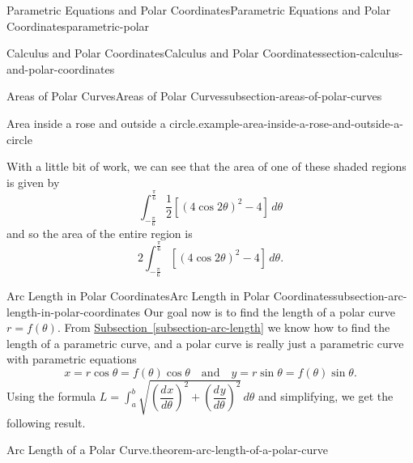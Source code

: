 \documentclass[oneside,10pt,]{book}
\numberwithin{equation}{section}
\newcommand{\dv}[3][]{\dfrac{d^{#1} #2}{d #3^{#1}}}
\begin{document}
\begin{chapterptx}{Parametric Equations and Polar Coordinates}{}{Parametric Equations and Polar Coordinates}{}{}{parametric-polar}
\begin{sectionptx}{Calculus and Polar Coordinates}{}{Calculus and Polar Coordinates}{}{}{section-calculus-and-polar-coordinates}
\begin{subsectionptx}{Areas of Polar Curves}{}{Areas of Polar Curves}{}{}{subsection-areas-of-polar-curves}
\begin{example}{Area inside a rose and outside a circle.}{example-area-inside-a-rose-and-outside-a-circle}
\begin{figure}
{
}
\end{figure}
\hypertarget{p-1053}{}%
With a little bit of work, we can see that the area of one of these shaded regions is given by%
%
\begin{equation*}
\int_{-\frac{\pi}{6}}^{\frac{\pi}{6}} \frac{1}{2}[(4\cos2\theta)^{2}-4]\,d\theta
\end{equation*}
\hypertarget{p-1054}{}%
and so the area of the entire region is%
%
\begin{equation*}
2\int_{-\frac{\pi}{6}}^{\frac{\pi}{6}}[(4\cos2\theta)^{2}-4]\,d\theta.
\end{equation*}
\end{example}
\end{subsectionptx}
%
%
\typeout{************************************************}
\typeout{************************************************}
%
\begin{subsectionptx}{Arc Length in Polar Coordinates}{}{Arc Length in Polar Coordinates}{}{}{subsection-arc-length-in-polar-coordinates}
\hypertarget{p-1055}{}%
Our goal now is to find the length of a polar curve \(r=f(\theta)\). From \hyperref[subsection-arc-length]{Subsection~\ref{subsection-arc-length}} we know how to find the length of a parametric curve, and a polar curve is really just a parametric curve with parametric equations%
%
\begin{equation*}
x = r\cos\theta = f(\theta)\cos\theta \quad\text{and}\quad y = r\sin\theta = f(\theta)\sin\theta.
\end{equation*}
\hypertarget{p-1056}{}%
Using the formula \(L = \int_{a}^{b}\sqrt{(\dv{x}{\theta})^{2}+(\dv{y}{\theta})^{2}}\,d\theta\) and simplifying, we get the following result.%
\begin{theorem}{Arc Length of a Polar Curve.}{}{theorem-arc-length-of-a-polar-curve}%
\hypertarget{p-1057}{}%

\end{theorem}
\end{subsectionptx}
\end{sectionptx}
\end{chapterptx}
\end{document}
